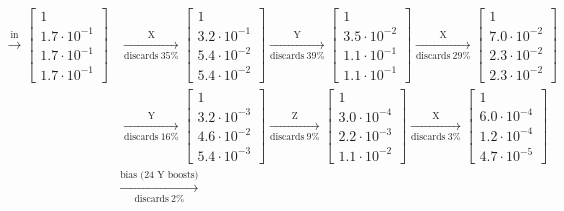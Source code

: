 \documentclass[onecolumn,unpublished,a4paper]{quantumarticle}
\theoremstyle{definition}
\theoremstyle{definition}
\theoremstyle{definition}
\begin{document}
\begin{figure}
    \centering
        $$\begin{aligned}
        \xrightarrow{\text{in}}
        \begin{bmatrix}1\\1.7\cdot 10^{-1}\\1.7\cdot 10^{-1}\\1.7\cdot 10^{-1}\end{bmatrix}
        & \xrightarrow[\text{discards}\ 35\%]{\text{X}}
        \begin{bmatrix}1\\3.2\cdot 10^{-1}\\5.4\cdot 10^{-2}\\5.4\cdot 10^{-2}\end{bmatrix}
        \xrightarrow[\text{discards}\ 39\%]{\text{Y}}
        \begin{bmatrix}1\\3.5\cdot 10^{-2}\\1.1\cdot 10^{-1}\\1.1\cdot 10^{-1}\end{bmatrix}
        \xrightarrow[\text{discards}\ 29\%]{\text{X}}
        \begin{bmatrix}1\\7.0\cdot 10^{-2}\\2.3\cdot 10^{-2}\\2.3\cdot 10^{-2}\end{bmatrix}
        \\& \xrightarrow[\text{discards}\ 16\%]{\text{Y}}
        \begin{bmatrix}1\\3.2\cdot 10^{-3}\\4.6\cdot 10^{-2}\\5.4\cdot 10^{-3}\end{bmatrix}
        \xrightarrow[\text{discards}\ 9\%]{\text{Z}}
        \begin{bmatrix}1\\3.0\cdot 10^{-4}\\2.2\cdot 10^{-3}\\1.1\cdot 10^{-2}\end{bmatrix}
        \xrightarrow[\text{discards}\ 3\%]{\text{X}}
        \begin{bmatrix}1\\6.0\cdot 10^{-4}\\1.2\cdot 10^{-4}\\4.7\cdot 10^{-5}\end{bmatrix}
        \\& \xrightarrow[\text{discards}\ 2\%]{\text{bias (24 Y boosts)}}

\end{aligned}$$
\end{figure}
\end{document}

